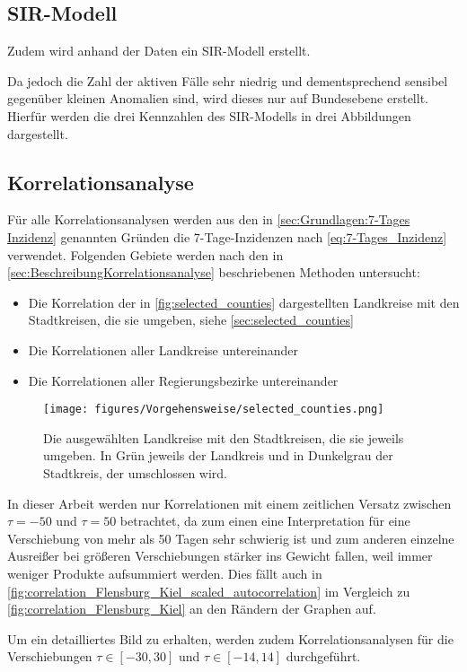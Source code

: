 \subsection{SIR-Modell}
Zudem wird anhand der Daten ein SIR-Modell erstellt.


Da jedoch die Zahl der aktiven Fälle sehr niedrig und dementsprechend sensibel gegenüber kleinen Anomalien sind, wird dieses nur auf Bundesebene erstellt. 
Hierfür werden die drei Kennzahlen des SIR-Modells in drei Abbildungen dargestellt.
\subsection{Korrelationsanalyse}
Für alle Korrelationsanalysen werden aus den in \autoref{sec:Grundlagen:7-Tages Inzidenz} genannten Gründen die 7-Tage-Inzidenzen nach \autoref{eq:7-Tages_Inzidenz} verwendet. Folgenden Gebiete werden nach den in \autoref{sec:BeschreibungKorrelationsanalyse} beschriebenen Methoden untersucht:
\begin{itemize}
    \item Die Korrelation der in \autoref{fig:selected_counties} dargestellten Landkreise mit den Stadtkreisen, die sie umgeben, siehe \autoref{sec:selected_counties}
    \item Die Korrelationen aller Landkreise untereinander
    \item Die Korrelationen aller Regierungsbezirke untereinander
\end{itemize}

\begin{figure}[H]
    \centering
    \texttt{[image: figures/Vorgehensweise/selected\_counties.png]}
    \caption{Die ausgewählten Landkreise mit den Stadtkreisen, die sie jeweils umgeben. In Grün jeweils der Landkreis und in Dunkelgrau der Stadtkreis, der umschlossen wird.}
    \label{fig:selected_counties}
\end{figure}
In dieser Arbeit werden nur Korrelationen mit einem zeitlichen Versatz zwischen $\tau=-50$ und $\tau=50$ betrachtet, da zum einen eine Interpretation für eine Verschiebung von mehr als 50 Tagen sehr schwierig ist und zum anderen einzelne Ausreißer bei größeren Verschiebungen stärker ins Gewicht fallen, weil immer weniger Produkte aufsummiert werden. Dies fällt auch in \autoref{fig:correlation_Flensburg_Kiel_scaled_autocorrelation} im Vergleich zu \autoref{fig:correlation_Flensburg_Kiel} an den Rändern der Graphen auf.

Um ein detailliertes Bild zu erhalten, werden zudem Korrelationsanalysen für die Verschiebungen $\tau\in[-30,30]$ und $\tau\in[-14,14]$ durchgeführt.

